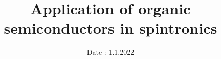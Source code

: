 

\subject{\vspace{-4cm}Semiconductor materials and nanostructures}  %
\title{\vspace{-0.5cm}Application of organic semiconductors in spintronics} %
\date{\vspace{-0.5cm}
 Date : 1.1.2022  %
}




\twocolumn[
\maketitle
\begin{onecolabstract}
  
\end{onecolabstract}
]


% 
% 


\printbibliography{}


